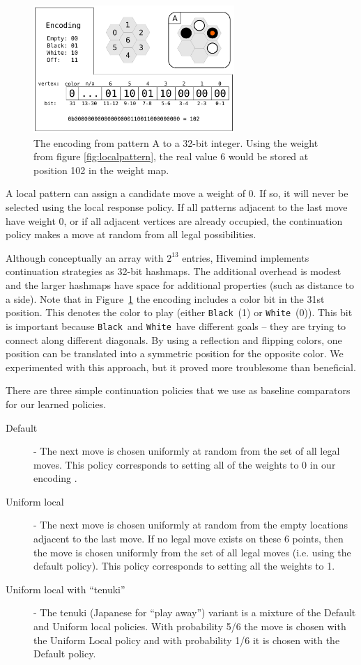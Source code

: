 \documentclass{acm_proc_article-sp}
\newcommand{\hblack}{\texttt{Black}}
\newcommand{\hwhite}{\texttt{White}}
\begin{document}
\begin{figure}
	\begin{center}
	\includegraphics[width=3.0in]{graphics/weight-pattern-map.pdf}
	\caption{The encoding from pattern A to a 32-bit integer. Using the weight from figure \ref{fig:localpattern}, the real value 6 would be stored at position 102 in the weight map.}
	\label{fig:encoding}
	\end{center}
\end{figure}

A local pattern can assign a candidate move a weight of 0. If so, it will never be selected using the local response policy. 
If all patterns adjacent to the last move have weight 0, or if all adjacent vertices are already occupied, 
the continuation policy makes a move at random from all legal possibilities.

Although conceptually an array with $2^{13}$ entries, Hivemind implements continuation strategies as
32-bit hashmaps.  
The additional overhead is modest and the larger hashmaps  have space for additional properties (such as distance to a side).
Note that in Figure~\ref{fig:encoding} the encoding includes a color bit in the 31st position. This denotes the color to play (either \hblack\ (1) or \hwhite\ (0)). 
This bit is important because \hblack\ and \hwhite\ have different goals -- they are trying to connect along different diagonals. 
By using a reflection and flipping colors, one position can be translated into a symmetric  position for the opposite color. 
We experimented with this approach, but it proved more troublesome than beneficial.

There are three simple continuation policies that we use as baseline comparators for our learned policies.

\begin{description}
	\item[Default] - The next move is chosen uniformly at random from the set of all legal moves.
	This policy corresponds to setting all of the weights to 0 in our encoding .
	\item[Uniform local] - The next move is chosen uniformly at random from the empty locations adjacent to the last move.
	If no legal move exists on these 6 points, then the move is chosen uniformly from the set of all legal moves 
	(i.e. using the default policy).  This policy corresponds to setting all the weights to 1.
	\item[Uniform local with ``tenuki''] - The tenuki (Japanese for  ``play away'') variant is a mixture of the Default and Uniform local policies.  
	With probability 5/6 the move is chosen with the Uniform Local policy and with probability 1/6 it is chosen with the Default policy. 
\end{description}
\end{document}
